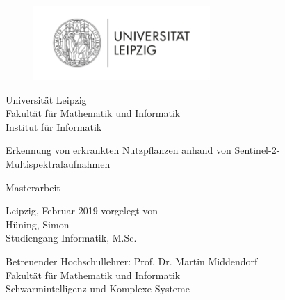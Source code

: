 \pagestyle{empty} %

\begin{figure}[t]
	\centering
	\includegraphics[width=0.6\textwidth]{pics/logo_uni_leipzig}
\end{figure}


\begin{center}
\normalsize Universität Leipzig\\
\normalsize Fakultät für Mathematik und Informatik\\
\normalsize Institut für Informatik

\vspace{90 pt}

\Huge Erkennung von erkrankten Nutzpflanzen anhand von Sentinel-2-Multispektralaufnahmen \\ 
\normalsize
\vspace{20 pt}

Masterarbeit

\vspace{60 pt}

Leipzig, Februar 2019
\hfill
vorgelegt von \\
\vspace{5 pt}
\hfill Hüning, Simon\\
\hfill \small Studiengang Informatik, M.Sc.

\vspace{75 pt}

\normalsize Betreuender Hochschullehrer: \hfill Prof. Dr. Martin Middendorf\\
\vspace{5 pt}
\hfill \small Fakultät für Mathematik und Informatik\\
\hfill \small Schwarmintelligenz und Komplexe Systeme

\end{center}

\newpage\null\thispagestyle{empty}\newpage